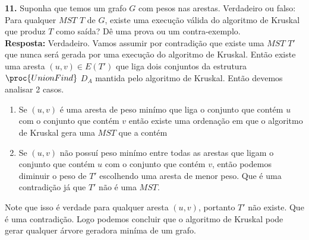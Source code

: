 
\textbf{11. } Suponha que temos um grafo $G$ com pesos nas arestas. Verdadeiro ou falso: Para qualquer $MST$ $T$ de $G$, existe uma execução válida do algoritmo de Kruskal que produz $T$ como saída? Dê uma prova ou um contra-exemplo.
\\[6pt]
\noindent \textbf{Resposta: }Verdadeiro. Vamos assumir por contradição que existe uma $MST$ $T'$ que nunca será gerada por uma execução do algoritmo de Kruskal. Então existe uma aresta $(u,v) \in E(T')$ que liga dois conjuntos da estrutura $\proc{UnionFind}$ $D_A$ mantida pelo algoritmo de Kruskal. Então devemos analisar 2 casos.
\begin{enumerate}
 \item Se $(u,v)$ é uma aresta de peso minímo que liga o conjunto que contém $u$ com o conjunto que contém $v$ então existe uma ordenação em que o algoritmo de Kruskal gera uma $MST$ que a contém 
 \item Se $(u,v)$ não possuí peso minímo entre todas as arestas que ligam o conjunto que contém $u$ com o conjunto que contém $v$, então podemos diminuir o peso de $T'$ escolhendo uma aresta de menor peso. Que é uma contradição já que $T'$ não é uma $MST$.
\end{enumerate}

\noindent Note que isso é verdade para qualquer aresta $(u,v)$, portanto $T'$ não existe. Que é uma contradição. Logo podemos concluir que o algoritmo de Kruskal pode gerar qualquer árvore geradora miníma de um grafo.\\[6pt]